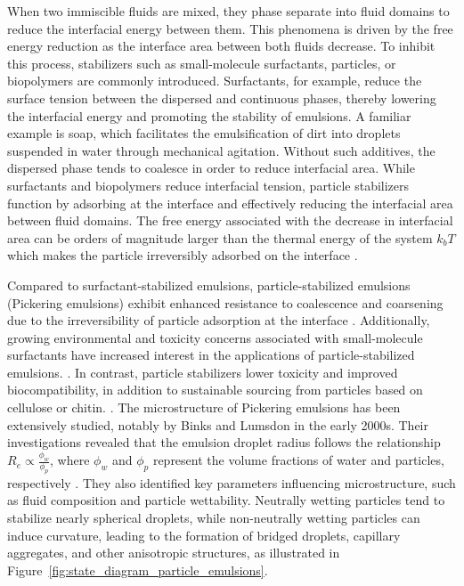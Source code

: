When two immiscible fluids are mixed, they phase separate into fluid domains to reduce the interfacial energy between them. This phenomena is driven by the free energy
reduction as the interface area between both fluids decrease. To inhibit this process, stabilizers such as small-molecule surfactants, particles, or biopolymers are commonly introduced. 
Surfactants, for example, reduce the surface tension between the dispersed and continuous phases, thereby lowering the interfacial energy and promoting the stability of emulsions. 
A familiar example is soap, which facilitates the emulsification of dirt into droplets suspended in water through mechanical agitation.
Without such additives, the dispersed phase tends to coalesce in order to reduce interfacial area. While surfactants and biopolymers reduce interfacial tension, particle stabilizers 
function by adsorbing at the interface and effectively reducing the interfacial area between fluid domains. The free energy associated with the decrease in interfacial area 
can be orders of magnitude larger than the thermal energy of the system $k_b T$ which makes the particle irreversibly adsorbed on the interface \cite{ngai_particle-stabilized_2015}.

Compared to surfactant-stabilized emulsions, particle-stabilized emulsions (Pickering emulsions) exhibit enhanced resistance to coalescence and coarsening
due to the irreversibility of particle adsorption at the interface \cite{ngai_particle-stabilized_2015} .
Additionally, growing environmental and toxicity concerns associated with small-molecule surfactants have increased interest in the applications of particle-stabilized emulsions.
\cite{kaczerewska_environmental_2020, lechuga_acute_2016}. In contrast, particle stabilizers lower toxicity and improved biocompatibility, in addition to 
sustainable sourcing from particles based on cellulose or chitin. \cite{fujisawa_nanocellulose-stabilized_2017, tang_stimuli-responsive_2016, kalliola_carboxymethyl_2018}.
The microstructure of Pickering emulsions has been extensively studied, notably by Binks and Lumsdon in the early 2000s. Their investigations revealed that the emulsion droplet radius 
follows the relationship $R_e \propto \frac{\phi_w}{\phi_p}$, where $\phi_w$ and $\phi_p$ represent the volume fractions of water and particles, respectively \cite{binks_pickering_2001}. 
They also identified key parameters influencing microstructure, such as fluid composition and particle wettability. Neutrally wetting particles tend to stabilize nearly spherical droplets, 
while non-neutrally wetting particles can induce curvature, leading to the formation of bridged droplets, capillary aggregates, and other anisotropic structures, as illustrated in 
Figure~\ref{fig:state_diagram_particle_emulsions}.

